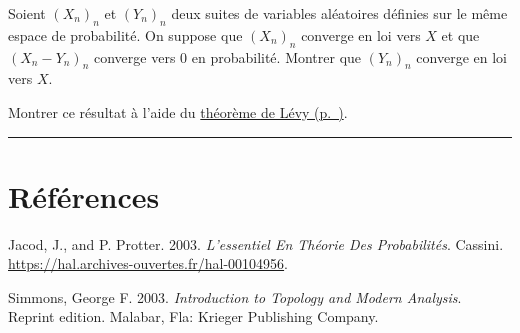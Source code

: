 \label{IV-slut2}
Soient \((X_n)_n\) et \((Y_n)_n\) deux suites de variables aléatoires
définies sur le même espace de probabilité. On suppose que \((X_n)_n\)
converge en loi vers \(X\) et que \((X_n - Y_n)_n\) converge vers 0 en
probabilité. Montrer que \((Y_n)_n\) converge en loi vers
\(X\).

\label{IV-slut3}
Montrer ce résultat à l'aide du
\protect\hyperref[IV-levytheorem]{théorème de
Lévy (p.~\pageref*{IV-levytheorem})}.

\begin{center}\rule{0.5\linewidth}{0.5pt}\end{center}



\chapter{Références}\label{IV-ruxe9fuxe9rences}

\hypertarget{refs}{}
\begin{cslreferences}
\leavevmode\hypertarget{refIV-Jacod}{}%
Jacod, J., and P. Protter. 2003. \emph{L'essentiel En Théorie Des
Probabilités}. Cassini.
\url{https://hal.archives-ouvertes.fr/hal-00104956}.

\leavevmode\hypertarget{refIV-Simmons}{}%
Simmons, George F. 2003. \emph{Introduction to Topology and Modern
Analysis}. Reprint edition. Malabar, Fla: Krieger Publishing Company.
\end{cslreferences}
